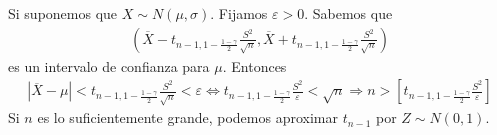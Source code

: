 Si suponemos que $X \sim N(\mu, \sigma)$. Fijamos $\varepsilon > 0$. Sabemos que
\begin{align*}
    \left( \overline{X} - t_{n-1, 1 - \frac{1-\gamma}{2}}\frac{S^2}{\sqrt{n}},\overline{X} + t_{n-1, 1 - \frac{1-\gamma}{2}}\frac{S^2}{\sqrt{n}} \right)
\end{align*}
es un intervalo de confianza para $\mu$. Entonces
\begin{align*}
    |\overline{X} - \mu| < t_{n-1, 1 - \frac{1-\gamma}{2}}\frac{S^2}{\sqrt{n}} < \varepsilon \Longleftrightarrow  t_{n-1, 1 - \frac{1-\gamma}{2}}\frac{S^2}{\varepsilon} < \sqrt{n} \Longrightarrow n > \left[ t_{n-1, 1 - \frac{1-\gamma}{2}}\frac{S^2}{\varepsilon}\right]
\end{align*}
Si $n$ es lo suficientemente grande, podemos aproximar $t_{n-1}$ por $Z \sim N(0,1)$.
